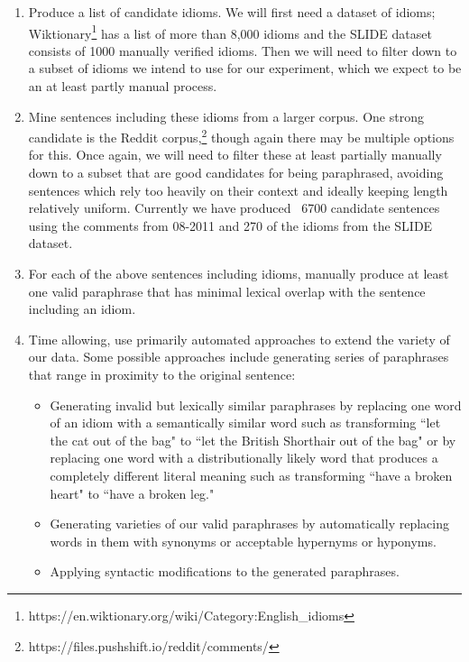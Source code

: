 \documentclass[11pt,a4paper]{article}
\begin{document}
\begin{enumerate}
    \item Produce a list of candidate idioms. We will first need a dataset of idioms; Wiktionary\footnote{https://en.wiktionary.org/wiki/Category:English\_idioms} has a list of more than 8,000 idioms and the SLIDE dataset \cite{Jochim2018SLIDEA} consists of 1000 manually verified idioms. Then we will need to filter down to a subset of idioms we intend to use for our experiment, which we expect to be an at least partly manual process.
    \item Mine sentences including these idioms from a larger corpus. One strong candidate is the Reddit corpus,\footnote{https://files.pushshift.io/reddit/comments/} though again there may be multiple options for this. Once again, we will need to filter these at least partially manually down to a subset that are good candidates for being paraphrased, avoiding sentences which rely too heavily on their context and ideally keeping length relatively uniform. Currently we have produced ~6700 candidate sentences using the comments from 08-2011 and 270 of the idioms from the SLIDE dataset.
    \item For each of the above sentences including idioms, manually produce at least one valid paraphrase that has minimal lexical overlap with the sentence including an idiom. 
    \item Time allowing, use primarily automated approaches to extend the variety of our data. Some possible approaches include generating series of paraphrases that range in proximity to the original sentence:
    \begin{itemize}
        \item Generating invalid but lexically similar paraphrases by replacing one word of an idiom  with a semantically similar word such as transforming ``let the cat out of the bag" to ``let the British Shorthair out of the bag" or by replacing one word with a distributionally likely word that produces a completely different literal meaning such as transforming ``have a broken heart" to ``have a broken leg."
        \item Generating varieties of our valid paraphrases by automatically replacing words in them with synonyms or acceptable hypernyms or hyponyms.
        \item Applying syntactic modifications to the generated paraphrases.
    \end{itemize}
\end{enumerate}
\end{document}

